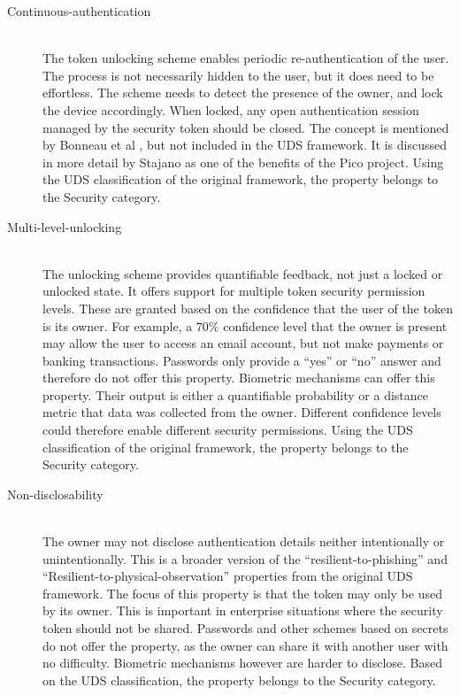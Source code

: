 \begin{description}
  \item[Continuous-authentication] \hfill \\
  The token unlocking scheme enables periodic re-authentication of the user. The process is not necessarily hidden to the user, but it does need to be effortless. The scheme needs to detect the presence of the owner, and lock the device accordingly. When locked, any open authentication session managed by the security token should be closed. The concept is mentioned by Bonneau et al \cite{bonneau2012quest}, but not included in the UDS framework. It is discussed in more detail by Stajano \cite{stajano2011pico} as one of the benefits of the Pico project. Using the UDS classification of the original framework, the property belongs to the Security category.
  
  \item[Multi-level-unlocking] \hfill \\
  The unlocking scheme provides quantifiable feedback, not just a locked or unlocked state. It offers support for multiple token security permission levels. These are granted based on the confidence that the user of the token is its owner. For example, a $70\%$ confidence level that the owner is present may allow the user to access an email account, but not make payments or banking transactions. Passwords only provide a ``yes'' or ``no'' answer and therefore do not offer this property. Biometric mechanisms can offer this property. Their output is either a quantifiable probability or a distance metric that data was collected from the owner. Different confidence levels could therefore enable different security permissions. Using the UDS classification of the original framework, the property belongs to the Security category. 
  
  \item[Non-disclosability] \hfill \\
  The owner may not disclose authentication details neither intentionally or unintentionally. This is a broader version of the ``resilient-to-phishing'' and ``Resilient-to-physical-observation'' properties from the original UDS framework. The focus of this property is that the token may only be used by its owner. This is important in enterprise situations where the security token should not be shared. Passwords and other schemes based on secrets do not offer the property, as the owner can share it with another user with no difficulty. Biometric mechanisms however are harder to disclose. Based on the UDS classification, the property belongs to the Security category.
  

\end{description}
